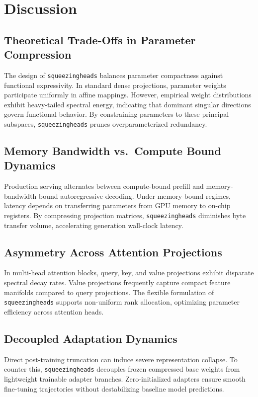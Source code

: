 \section{Discussion}

\subsection{Theoretical Trade-Offs in Parameter Compression}
The design of \texttt{squeezingheads} balances parameter compactness against functional expressivity. In standard dense projections, parameter weights participate uniformly in affine mappings. However, empirical weight distributions exhibit heavy-tailed spectral energy, indicating that dominant singular directions govern functional behavior. By constraining parameters to these principal subspaces, \texttt{squeezingheads} prunes overparameterized redundancy.

\subsection{Memory Bandwidth vs.\ Compute Bound Dynamics}
Production serving alternates between compute-bound prefill and memory-bandwidth-bound autoregressive decoding. Under memory-bound regimes, latency depends on transferring parameters from GPU memory to on-chip registers. By compressing projection matrices, \texttt{squeezingheads} diminishes byte transfer volume, accelerating generation wall-clock latency.

\subsection{Asymmetry Across Attention Projections}
In multi-head attention blocks, query, key, and value projections exhibit disparate spectral decay rates. Value projections frequently capture compact feature manifolds compared to query projections. The flexible formulation of \texttt{squeezingheads} supports non-uniform rank allocation, optimizing parameter efficiency across attention heads.

\subsection{Decoupled Adaptation Dynamics}
Direct post-training truncation can induce severe representation collapse. To counter this, \texttt{squeezingheads} decouples frozen compressed base weights from lightweight trainable adapter branches. Zero-initialized adapters ensure smooth fine-tuning trajectories without destabilizing baseline model predictions.

